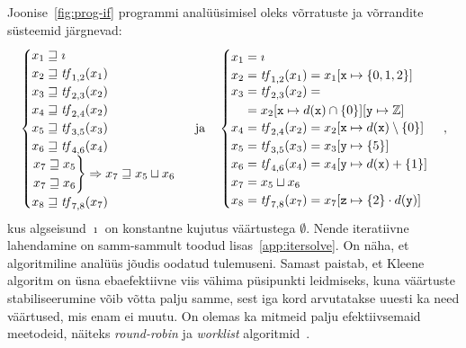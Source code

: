 \documentclass[../thesis.tex]{subfiles}
\begin{document}
Joonise~\ref{fig:prog-if} programmi analüüsimisel oleks võrratuste ja võrrandite süsteemid järgnevad:
\[
	\begin{cases}
		x_1 \sqgeq \imath \\
		x_2 \sqgeq \tf_{1,2}(x_1) \\
		x_3 \sqgeq \tf_{2,3}(x_2) \\
		x_4 \sqgeq \tf_{2,4}(x_2) \\
		x_5 \sqgeq \tf_{3,5}(x_3) \\
		x_6 \sqgeq \tf_{4,6}(x_4) \\
		\begin{rcases*}
			x_7 \sqgeq x_5 \\
			x_7 \sqgeq x_6
		\end{rcases*} \Rightarrow x_7 \sqgeq x_5 \sqcup x_6 \\
		x_8 \sqgeq \tf_{7,8}(x_7)
	\end{cases}
	\  \text{ja} \quad
	\begin{cases}
		x_1 = \imath \\
		x_2 = \tf_{1,2}(x_1) = x_1[\texttt{x} \mapsto \{0, 1, 2\}] \\
		\begin{aligned}
		x_3 &= \tf_{2,3}(x_2) = \\
		&= x_2[\texttt{x} \mapsto d(\texttt{x}) \cap \{0\}][\texttt{y} \mapsto \mathbb{Z}]
		\end{aligned} \\
		x_4 = \tf_{2,4}(x_2) = x_2[\texttt{x} \mapsto d(\texttt{x}) \setminus \{0\}] \\
		x_5 = \tf_{3,5}(x_3) = x_3[\texttt{y} \mapsto \{5\}] \\
		x_6 = \tf_{4,6}(x_4) = x_4[\texttt{y} \mapsto d(\texttt{x}) + \{1\}] \\
		x_7 = x_5 \sqcup x_6 \\
		x_8 = \tf_{7,8}(x_7) = x_7[\texttt{z} \mapsto \{2\} \cdot d(\texttt{y})]
	\end{cases},
\]
kus algseisund $\imath$ on konstantne kujutus väärtustega $\emptyset$.
Nende iteratiivne lahendamine on samm-sammult toodud lisas~\ref{app:itersolve}.
On näha, et algoritmiline analüüs jõudis oodatud tulemuseni. Samast paistab, et Kleene algoritm on üsna ebaefektiivne viis vähima püsipunkti leidmiseks, kuna väärtuste stabiliseerumine võib võtta palju samme, sest iga kord arvutatakse uuesti ka need väärtused, mis enam ei muutu. On olemas ka mitmeid palju efektiivsemaid meetodeid, näiteks \textit{round-robin} ja \textit{worklist} algoritmid~\cite[24,83]{seidl_foundations}.
\end{document}
